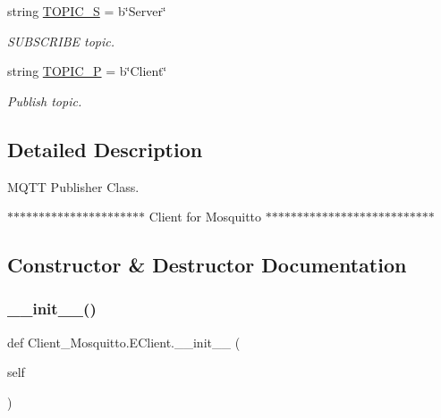 \begin{DoxyCompactItemize}
string \mbox{\hyperlink{class_client___mosquitto_1_1_e_client_a5b0de91c7d56c6301c65a784a86e9b4d}{T\+O\+P\+I\+C\+\_\+S}} = b\char`\"{}Server\char`\"{}
\begin{DoxyCompactList}\small\item\em S\+U\+B\+S\+C\+R\+I\+BE topic. \end{DoxyCompactList}\item 
string \mbox{\hyperlink{class_client___mosquitto_1_1_e_client_a486b4302ac4cb3a2ee885e44ac493085}{T\+O\+P\+I\+C\+\_\+P}} = b\char`\"{}Client\char`\"{}
\begin{DoxyCompactList}\small\item\em Publish topic. \end{DoxyCompactList}\end{DoxyCompactItemize}


\subsection{Detailed Description}
M\+Q\+TT Publisher Class. 

$\ast$$\ast$$\ast$$\ast$$\ast$$\ast$$\ast$$\ast$$\ast$$\ast$$\ast$$\ast$$\ast$$\ast$$\ast$$\ast$$\ast$$\ast$$\ast$$\ast$$\ast$$\ast$ Client for Mosquitto $\ast$$\ast$$\ast$$\ast$$\ast$$\ast$$\ast$$\ast$$\ast$$\ast$$\ast$$\ast$$\ast$$\ast$$\ast$$\ast$$\ast$$\ast$$\ast$$\ast$$\ast$$\ast$$\ast$$\ast$$\ast$$\ast$$\ast$ 

\subsection{Constructor \& Destructor Documentation}
\mbox{\label{class_client___mosquitto_1_1_e_client_a18c4df566d15af27913550e6b5f4cf50}} 
\subsubsection{\texorpdfstring{\+\_\+\+\_\+init\+\_\+\+\_\+()}{\_\_init\_\_()}}
{\footnotesize\ttfamily def Client\+\_\+\+Mosquitto.\+E\+Client.\+\_\+\+\_\+init\+\_\+\+\_\+ (\begin{DoxyParamCaption}\item[{}]{self }\end{DoxyParamCaption})}



